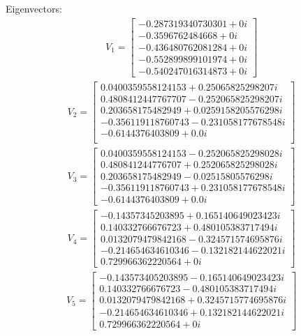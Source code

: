 \documentclass[a4paper, 12pt]{article}
\begin{document}
Eigenvectors:
\begin{align}
	V_1 = 
	\begin{bmatrix}
		-0.287319340730301+0i\\-0.3596762484668+0i\\-0.436480762081284+0i\\-0.552899899101974+0i\\
		-0.540247016314873+0i
	\end{bmatrix}
\end{align}
\begin{align}
	V_2=
	\begin{bmatrix}
		0.0400359558124153+0.25065825298207i\\0.4808412447767707-0.252065825298207i\\
		0.203658175482949+0.0259158205576298i\\-0.356119118760743-0.231058177678548i\\
		-0.6144376403809+0.0i\\
	\end{bmatrix}
\end{align}
\begin{align}
	V_3 = 
	\begin{bmatrix}
		0.0400359558124153-0.252065825298028i\\0.480841244776707+0.252065825298028i\\
		0.203658175482949-0.02515805576298i\\-0.356119118760743+0.231058177678548i\\
		-0.6144376403809+0.0i
	\end{bmatrix}
\end{align}
\begin{align}
	V_4=
	\begin{bmatrix}
		-0.14357345203895+0.165140649023423i\\0.140332766676723+0.480105383717494i\\
		0.0132079479842168-0.324571574695876i\\-0.214654634610346-0.132182144622021i\\
		0.729966362220564+0i
	\end{bmatrix}
\end{align}
\begin{align}
	V_5=
	\begin{bmatrix}
		-0.143573405203895-0.165140649023423i\\0.140332766676723-0.480105383717494i\\
		0.0132079479842168+0.3245715774695876i\\-0.214654634610346+0.132182144622021i\\
		0.729966362220564+0i
	\end{bmatrix}
\end{align}
\end{document}
